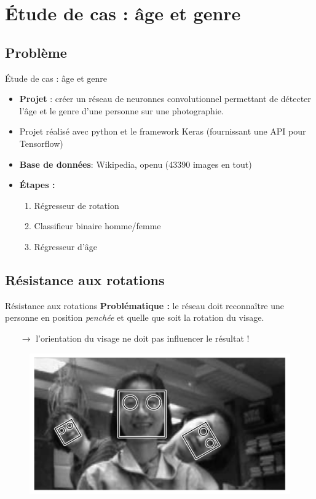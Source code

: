 \documentclass[compress]{beamer}
\begin{document}
\section{\'Etude de cas : âge et genre}
\subsection{Problème}
\begin{frame}{\'Etude de cas : âge et genre}
  \begin{itemize}
    \item
    \textbf{\color{fibeamer@orange}Projet} : créer un réseau de neuronnes convolutionnel
    permettant de détecter l'{\color{fibeamer@orange}âge} et le {\color{fibeamer@orange}genre} d'une personne sur une photographie.
    \item Projet réalisé avec python et le framework Keras (fournissant une API pour Tensorflow)
    \item \textbf{\color{fibeamer@orange}Base de données}: Wikipedia, openu (43390 images en tout)
    \item \textbf{\color{fibeamer@orange}\'Etapes :}
    \begin{enumerate}
      \item Régresseur de rotation
      \item Classifieur binaire homme/femme
      \item Régresseur d'âge
    \end{enumerate}
  \end{itemize}
\end{frame}
\subsection{Résistance aux rotations}

\begin{frame}{Résistance aux rotations}
  \textbf{\color{fibeamer@orange}Problématique :} le réseau doit reconnaître une personne en position \textit{penchée} et quelle que soit la rotation du visage.
  \begin{itemize}
    \item[$\rightarrow$] l'orientation du visage ne doit pas influencer le résultat !
  \end{itemize}
  \vspace{-.03\linewidth}
  \begin{figure}
    \includegraphics[width=0.8\linewidth]{resources/rotation2}
  \end{figure}
\end{frame}
\end{document}
